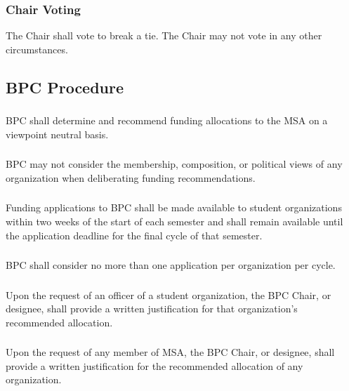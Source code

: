 \subsubsection{Chair Voting}
\subsubsubsection{}
The Chair shall vote to break a tie. 
\subsubsubsection{}
The Chair may not vote in any other circumstances.


\subsection{BPC Procedure}
\subsubsection{}
BPC shall determine and recommend funding allocations to the MSA on a viewpoint neutral basis. 

\subsubsection{}
BPC may not consider the membership, composition, or political views of any organization when deliberating funding recommendations. 

\subsubsection{}
Funding applications to BPC shall be made available to student organizations within two weeks of the start of each semester and shall remain available until the application deadline for the final cycle of that semester.

\subsubsection{}
BPC shall consider no more than one application per organization per cycle.

\subsubsection{}
Upon the request of an officer of a student organization, the BPC Chair, or designee, shall provide a written justification for that organization's recommended allocation.

\subsubsection{}
Upon the request of any member of MSA, the BPC Chair, or designee, shall provide a written justification for the recommended allocation of any organization. 

